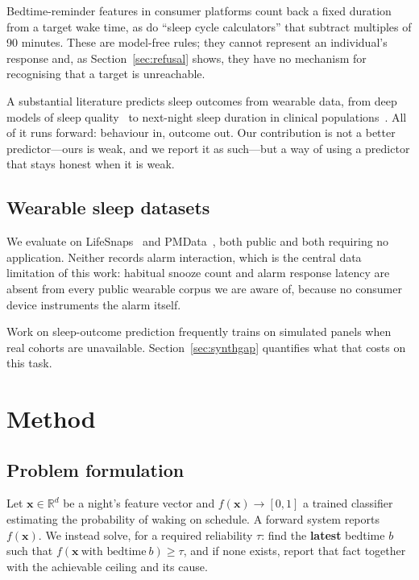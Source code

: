 \documentclass[conference]{IEEEtran}
\begin{document}
Bedtime-reminder features in consumer platforms count back a fixed duration from
a target wake time, as do ``sleep cycle calculators'' that subtract multiples of
90 minutes. These are model-free rules; they cannot represent an individual's
response and, as Section~\ref{sec:refusal} shows, they have no mechanism for
recognising that a target is unreachable.

A substantial literature predicts sleep outcomes from wearable data, from deep
models of sleep quality~\cite{sathya} to next-night sleep duration in clinical
populations~\cite{fellger}. All of it runs forward: behaviour in, outcome out.
Our contribution is not a better predictor---ours is weak, and we report it as
such---but a way of using a predictor that stays honest when it is weak.

\subsection{Wearable sleep datasets}

We evaluate on LifeSnaps~\cite{lifesnaps} and PMData~\cite{pmdata}, both public
and both requiring no application. Neither records alarm interaction, which is
the central data limitation of this work: habitual snooze count and alarm
response latency are absent from every public wearable corpus we are aware of,
because no consumer device instruments the alarm itself.

Work on sleep-outcome prediction frequently trains on simulated panels when real
cohorts are unavailable. Section~\ref{sec:synthgap} quantifies what that costs
on this task.

\section{Method}
\label{sec:method}

\subsection{Problem formulation}

Let $\mathbf{x} \in \mathbb{R}^d$ be a night's feature vector and
$f(\mathbf{x}) \rightarrow [0,1]$ a trained classifier estimating the
probability of waking on schedule. A forward system reports $f(\mathbf{x})$. We
instead solve, for a required reliability $\tau$: find the \textbf{latest}
bedtime $b$ such that $f(\mathbf{x}\ \text{with bedtime}\ b) \ge \tau$, and if
none exists, report that fact together with the achievable ceiling and its
cause.
\end{document}
